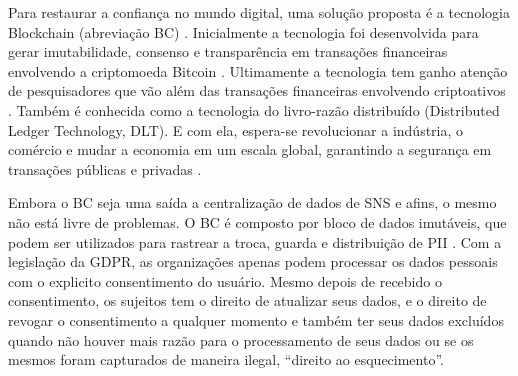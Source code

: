 

Para restaurar a confiança no mundo digital, uma solução proposta é a tecnologia Blockchain (abreviação BC) \citep{Schwerin2018}. Inicialmente a tecnologia foi desenvolvida para gerar imutabilidade, consenso e transparência em transações financeiras envolvendo a criptomoeda Bitcoin \citep{Nakamoto2009}. Ultimamente a tecnologia tem ganho atenção de pesquisadores que vão além das transações financeiras envolvendo criptoativos \citep{Al-ZabenNasr2018:article}. Também é conhecida como a tecnologia do livro-razão distribuído (Distributed Ledger Technology, DLT). E com ela, espera-se revolucionar a indústria, o comércio e mudar a economia em um escala global, garantindo a segurança em transações públicas e privadas \citep{Underwood2016:article}. %

Embora o BC seja uma saída a centralização de dados de SNS e afins, o mesmo não está livre de problemas. O BC é composto por bloco de dados imutáveis, que podem ser utilizados para rastrear a troca, guarda e distribuição de PII \citep{Al-ZabenNasr2018:article}. Com a legislação da GDPR, as organizações apenas podem processar os dados pessoais com o explicito consentimento do usuário. Mesmo depois de recebido o consentimento, os sujeitos tem o direito de atualizar seus dados, e o direito de revogar o consentimento a qualquer momento e também ter seus dados excluídos quando não houver mais razão para o processamento de seus dados ou se os mesmos foram capturados de maneira ilegal, ``direito ao esquecimento''. \citep{EuropeanCommission2016:misc} %




